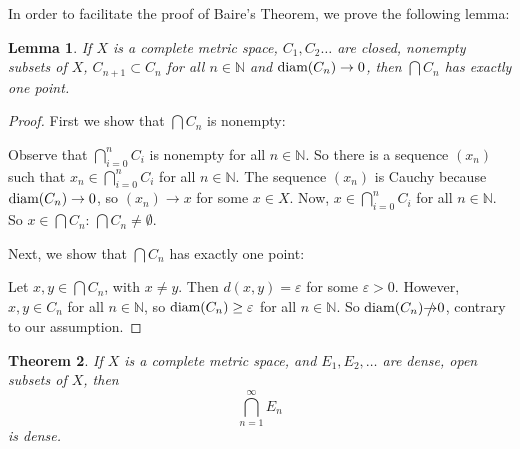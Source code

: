 \documentclass{amsart}
\newcommand{\vep}{\varepsilon}
\newcommand{\N}{\mathbb{N}}
\newcommand{\diam}{\text{\rm diam}}
\newtheorem{thm}{Theorem}[section]
\newtheorem{lem}[thm]{Lemma}
\theoremstyle{definition}
\begin{document}
In order to facilitate the proof of Baire's Theorem, we prove the following lemma:

\begin{lem}
If $X$ is a complete metric space, $C_1, C_2 \ldots$ are closed, nonempty subsets of $X$, $C_{n+1} \subset C_n$ for all $n \in \N$ and $\diam(C_n) \to 0$, then $\bigcap C_n$ has exactly one point.
\end{lem}

\begin{proof}
First we show that $\bigcap C_n$ is nonempty: 

Observe that $\bigcap\limits_{i=0}^n C_i$ is nonempty for all $n \in \N$. 
So there is a sequence $(x_n)$ such that $x_n \in \bigcap\limits_{i=0}^n C_i$ for all $n \in \N$. 
The sequence $(x_n)$ is Cauchy because $\diam(C_n) \to 0$, so $(x_n) \to x$ for some $x \in X$.
Now, $x \in \bigcap\limits_{i=0}^n C_i$ for all $n \in \N$.
So $x \in \bigcap C_n$: $\bigcap C_n \neq \emptyset$.

Next, we show that $\bigcap C_n$ has exactly one point:

Let $x, y \in \bigcap C_n$, with $x \neq y$. 
Then $d(x,y) = \vep$ for some $\vep >0$. 
However, $x,y \in C_n$ for all $n \in \N$,
so $\diam(C_n) \geq \vep$ for all $n \in \N$. 
So $\diam(C_n) \slashed{\to} 0$, contrary to our assumption.
\end{proof}

\begin{thm}If $X$ is a complete metric space, and $E_1, E_2, \ldots$ are dense, open subsets of $X$, then
\begin{displaymath}
\bigcap\limits_{n = 1}^{\infty} E_n
\end{displaymath}
is dense.
\end{thm}
\end{document}
